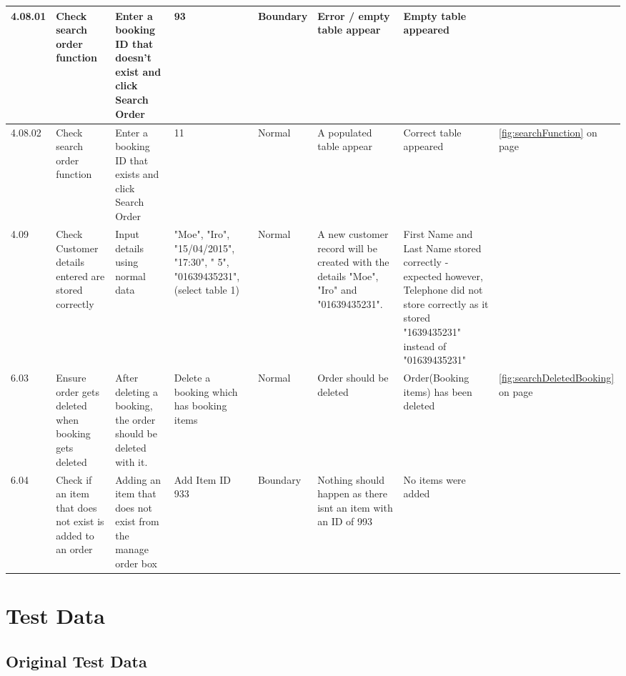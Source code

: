 \begin{landscape}
\begin{center}
\begin{longtable}{|p{1.5cm}|p{2.5cm}|p{2.5cm}|p{2cm}|p{2cm}|p{2cm}|p{2cm}|p{2cm}|}
           4.08.01 & Check search order function & Enter a booking ID that doesn't exist and click Search Order & 93 &  Boundary &  Error / empty table appear &  Empty table appeared  &  \\ \hline
           4.08.02& Check search order function & Enter a booking ID that exists and click Search Order & 11 &  Normal &  A populated table appear & Correct table appeared   & \ref{fig:searchFunction} on page \pageref{fig:searchFunction} \\ \hline
	4.09 & Check Customer details entered are stored correctly & Input details using normal data & "Moe", "Iro", "15/04/2015", "17:30", " 5", "01639435231", (select table 1)  & Normal & A new customer record will be created with the details "Moe", "Iro" and "01639435231". & First Name and Last Name stored correctly - expected however, Telephone did not store correctly as it stored "1639435231" instead of "01639435231" & \\ \hline
	6.03 & Ensure order gets deleted when booking gets deleted & After deleting a booking, the order should be deleted with it.  & Delete a booking which has booking items   & Normal & Order should be deleted &Order(Booking items) has been deleted &\ref{fig:searchDeletedBooking} on page \pageref{fig:searchDeletedBooking} \\ \hline
	6.04 & Check if an item that does not exist is added to an order & Adding an item that does not exist from the manage order box  & Add Item ID 933 & Boundary & Nothing should happen as there isnt an item with an ID of 993 & No items were added& \\ \hline
	


    \end{longtable}
\end{center}
\end{landscape}

\section{Test Data}

\subsection{Original Test Data}

